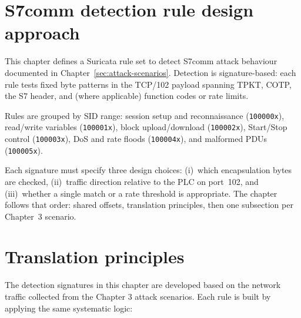 \documentclass[../main.tex]{subfiles}
\begin{document}
\section{S7comm detection rule design approach}
\label{sec:detection-overview}

This chapter defines a Suricata rule set to detect S7comm attack behaviour documented in Chapter~\ref{sec:attack-scenarios}. Detection is signature-based: each rule tests fixed byte patterns in the TCP/102 payload spanning TPKT, COTP, the S7 header, and (where applicable) function codes or rate limits.

Rules are grouped by SID range: session setup and reconnaissance (\texttt{100000x}), read/write variables (\texttt{100001x}), block upload/download (\texttt{100002x}), Start/Stop control (\texttt{100003x}), DoS and rate floods (\texttt{100004x}), and malformed PDUs (\texttt{100005x}).

Each signature must specify three design choices: (i)~which encapsulation bytes are checked, (ii)~traffic direction relative to the PLC on port~102, and (iii)~whether a single match or a rate threshold is appropriate. The chapter follows that order: shared offsets, translation principles, then one subsection per Chapter~3 scenario.

\section{Translation principles}
\label{sec:pcap-to-rules}

The detection signatures in this chapter are developed based on the network traffic collected from the Chapter 3 attack scenarios. Each rule is built by applying the same systematic logic:
\end{document}
